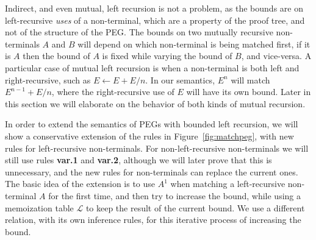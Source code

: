 Indirect, and even mutual, left recursion is not a problem, as the
bounds are on left-recursive {\em uses} of a non-terminal, which are a property
of the proof tree, and not of the structure of the PEG. The bounds on two mutually
recursive non-terminals $A$ and $B$ will depend on which non-terminal
is being matched first, if it is $A$ then the bound of $A$ is fixed
while varying the bound of $B$, and vice-versa. A particular case of
mutual left recursion is when a non-terminal is both left and
right-recursive, such as $E \leftarrow E + E / n$. In our semantics,
$E^n$ will match $E^{n-1} + E / n$, where the right-recursive use of
$E$ will have its own bound. Later in this section we will elaborate
on the behavior of both kinds of mutual recursion.

In order to extend the semantics of PEGs with bounded left recursion,
we will show a conservative extension of the rules in
Figure~\ref{fig:matchpeg}, with new rules for left-recursive
non-terminals. For non-left-recursive non-terminals we will still use
rules {\bf var.1} and {\bf var.2}, although we will later prove that
this is unnecessary, and the new rules for non-terminals can replace
the current ones. The basic idea of the extension is
to use $A^1$ when matching a left-recursive non-terminal $A$
for the first time, and then try to increase the bound, while using
a memoization table $\mathcal{L}$ to keep the result of the current
bound. We use a different relation, with its own inference rules, for
this iterative process of increasing the bound.

